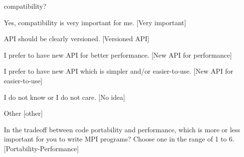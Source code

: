 \documentclass[conference,10pt,letterpaper]{IEEEtran}
\begin{document}
{{\begin{description}
    compatibility? 
    \begin{inparaenum}[{\bf C}1)]
    \item Yes, compatibility is very important for me. [Very important]
    \item API should be clearly versioned. [Versioned API]
    \item I prefer to have new API for better performance. [New API for performance]
    \item I prefer to have new API which is simpler and/or
      easier-to-use. [New API for easier-to-use] 
    \item I do not know or I do not care. [No idea]
    \item Other [other]
    \end{inparaenum}
  \item[Q29:] In the tradeoff between code portability and performance,
    which is more or less important for you to write MPI programs? 
    Choose one in the range of 1 to 6. [Portability-Performance]
  \end{description}
}}
\end{document}
